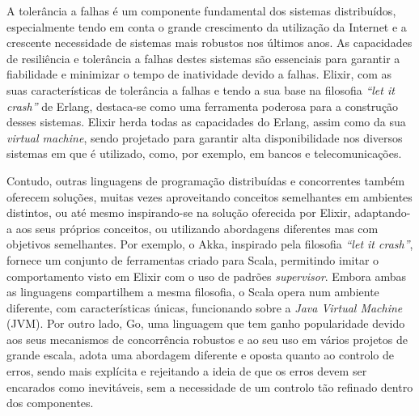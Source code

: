 \begin{abstractotherlanguage}


A tolerância a falhas é um componente fundamental dos sistemas distribuídos, especialmente tendo em conta o grande crescimento da utilização da Internet e a crescente necessidade de sistemas mais robustos nos últimos anos. As capacidades de resiliência e tolerância a falhas destes sistemas são essenciais para garantir a fiabilidade e minimizar o tempo de inatividade devido a falhas. Elixir, com as suas características de tolerância a falhas e tendo a sua base na filosofia \textit{“let it crash”} de Erlang, destaca-se como uma ferramenta poderosa para a construção desses sistemas. Elixir herda todas as capacidades do Erlang, assim como da sua \textit{virtual machine}, sendo projetado para garantir alta disponibilidade nos diversos sistemas em que é utilizado, como, por exemplo, em bancos e telecomunicações.

Contudo, outras linguagens de programação distribuídas e concorrentes também oferecem soluções, muitas vezes aproveitando conceitos semelhantes em ambientes distintos, ou até mesmo inspirando-se na solução oferecida por Elixir, adaptando-a aos seus próprios conceitos, ou utilizando abordagens diferentes mas com objetivos semelhantes. Por exemplo, o Akka, inspirado pela filosofia \textit{“let it crash”}, fornece um conjunto de ferramentas criado para Scala, permitindo imitar o comportamento visto em Elixir com o uso de padrões \textit{supervisor}. Embora ambas as linguagens compartilhem a mesma filosofia, o Scala opera num ambiente diferente, com características únicas, funcionando sobre a \textit{Java Virtual Machine} (JVM). Por outro lado, Go, uma linguagem que tem ganho popularidade devido aos seus mecanismos de concorrência robustos e ao seu uso em vários projetos de grande escala, adota uma abordagem diferente e oposta quanto ao controlo de erros, sendo mais explícita e rejeitando a ideia de que os erros devem ser encarados como inevitáveis, sem a necessidade de um controlo tão refinado dentro dos componentes.


\end{abstractotherlanguage}
